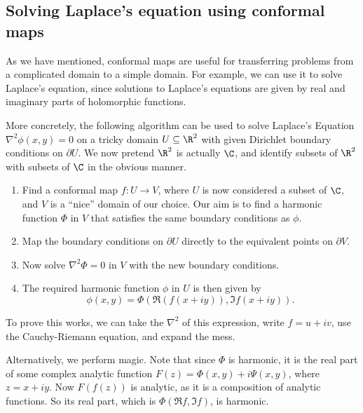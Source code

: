 \documentclass[a4paper]{article}
\begin{document}
\subsection{Solving Laplace's equation using conformal maps}
As we have mentioned, conformal maps are useful for transferring problems from a complicated domain to a simple domain. For example, we can use it to solve Laplace's equation, since solutions to Laplace's equations are given by real and imaginary parts of holomorphic functions.

More concretely, the following algorithm can be used to solve Laplace's Equation $\nabla^2 \phi(x, y) = 0$ on a tricky domain $U \subseteq \R^2$ with given Dirichlet boundary conditions on $\partial U$. We now pretend $\R^2$ is actually $\C$, and identify subsets of $\R^2$ with subsets of $\C$ in the obvious manner.
\begin{enumerate}
  \item Find a conformal map $f: U \to V$, where $U$ is now considered a subset of $\C$, and $V$ is a ``nice'' domain of our choice. Our aim is to find a harmonic function $\Phi$ in $V$ that satisfies the same boundary conditions as $\phi$.
  \item Map the boundary conditions on $\partial U$ directly to the equivalent points on $\partial V$.
  \item Now solve $\nabla^2 \Phi = 0$ in $V$ with the new boundary conditions.
  \item The required harmonic function $\phi$ in $U$ is then given by
    \[
      \phi(x, y) = \Phi(\Re(f(x + iy)), \Im f(x + iy)).
    \]
\end{enumerate}
To prove this works, we can take the $\nabla^2$ of this expression, write $f = u + iv$, use the Cauchy-Riemann equation, and expand the mess.

Alternatively, we perform magic. Note that since $\Phi$ is harmonic, it is the real part of some complex analytic function $F(z) = \Phi(x, y) + i \Psi(x, y)$, where $z = x + iy$. Now $F(f(z))$ is analytic, as it is a composition of analytic functions. So its real part, which is $\Phi(\Re f, \Im f)$, is harmonic.
\end{document}
